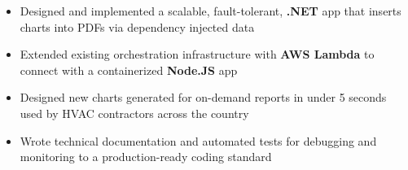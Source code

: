 \begin{itemize}
    \item Designed and implemented a scalable, fault-tolerant, \textbf{.NET} app that inserts charts into PDFs via dependency injected data
    \item Extended existing orchestration infrastructure with \textbf{AWS Lambda} to connect with a containerized \textbf{Node.JS} app
    \item Designed new charts generated for on-demand reports in under 5 seconds used by HVAC contractors across the country
    \item Wrote technical documentation and automated tests for debugging and monitoring to a production-ready coding standard
\end{itemize}